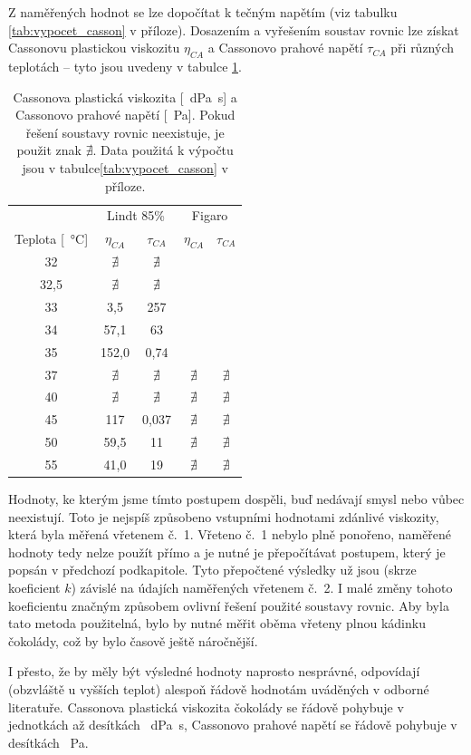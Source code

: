 \documentclass[12pt]{article}
\begin{document}
Z naměřených hodnot se lze dopočítat k tečným napětím (viz tabulku \ref{tab:vypocet_casson} v příloze). Dosazením a vyřešením soustav rovnic lze získat Cassonovu plastickou viskozitu $\eta_{CA}$ a Cassonovo prahové napětí $\tau_{CA}$ při různých teplotách -- tyto jsou uvedeny v tabulce \ref{tab:vysledky_casson}.
\begin{table}[h!]
    \centering
    \begin{tabular}{|c|c c|c c|}
        \hline
        & \multicolumn{2}{c|}{Lindt 85\%} & \multicolumn{2}{c|}{Figaro}\\
        Teplota [\SI{}{\degreeCelsius}] & $\eta_{CA}$ & $\tau_{CA}$ & $\eta_{CA}$ & $\tau_{CA}$ \\\hline
        32 & $\nexists$ & $\nexists$ & &\\
        32,5 & $\nexists$ & $\nexists$ & &\\
        33 & 3,5 & 257 & & \\
        34 & 57,1 & 63 & & \\
        35 & 152,0 & 0,74 & & \\
        37 & $\nexists$ & $\nexists$ & $\nexists$ & $\nexists$\\
        40 & $\nexists$ & $\nexists$ & $\nexists$ & $\nexists$\\
        45 & 117 & 0,037 & $\nexists$ & $\nexists$\\
        50 & 59,5 & 11 & $\nexists$ & $\nexists$\\
        55 & 41,0 & 19 & $\nexists$ & $\nexists$\\\hline 
    \end{tabular}
    \caption{Cassonova plastická viskozita [\SI{}{\deci\pascal\second}] a Cassonovo prahové napětí [\SI{}{\pascal}]. Pokud řešení soustavy rovnic neexistuje, je použit znak $\nexists$. Data použitá k výpočtu jsou v tabulce\ref{tab:vypocet_casson} v příloze.}
    \label{tab:vysledky_casson}
\end{table}
\par\noindent
Hodnoty, ke kterým jsme tímto postupem dospěli, buď nedávají smysl nebo vůbec neexistují. Toto je nejspíš způsobeno vstupními hodnotami zdánlivé viskozity, která byla měřená vřetenem č.~1. Vřeteno č.~1 nebylo plně ponořeno, naměřené hodnoty tedy nelze použít přímo a je nutné je přepočítávat postupem, který je popsán v předchozí podkapitole. Tyto přepočtené výsledky už jsou (skrze koeficient $k$) závislé na údajích naměřených vřetenem č.~2. I malé změny tohoto koeficientu značným způsobem ovlivní řešení použité soustavy rovnic. Aby byla tato metoda použitelná, bylo by nutné měřit oběma vřeteny plnou kádinku čokolády, což by bylo časově ještě náročnější.
\par\noindent
I přesto, že by měly být výsledné hodnoty naprosto nesprávné, odpovídají (obzvláště u vyšších teplot) alespoň řádově hodnotám uváděných v odborné literatuře. Cassonova plastická viskozita čokolády se řádově pohybuje v jednotkách až desítkách \SI{}{\deci\pascal\second}, Cassonovo prahové napětí se řádově pohybuje v desítkách \SI{}{\pascal}.~\cite{Article:Rapid_and_economic_chocolate_viscosity}\cite{Article:viscosity_molten_milk_chocolate}\cite{Article:chocolate_shear_stress}
\end{document}
